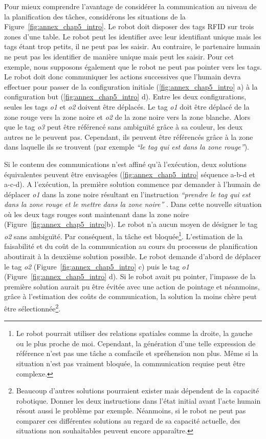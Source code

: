 Pour mieux comprendre l'avantage de considérer la communication au niveau de la planification des tâches, considérons les situations de la Figure~\ref{fig:annex_chap5_intro}. Le robot doit disposer des tags RFID sur trois zones d'une table. Le robot peut les identifier avec leur identifiant unique mais les tags étant trop petits, il ne peut pas les saisir. Au contraire, le partenaire humain ne peut pas les identifier de manière unique mais peut les saisir. Pour cet exemple, nous supposons également que le robot ne peut pas pointer vers les tags. Le robot doit donc communiquer les actions successives que l'humain devra effectuer pour passer de la configuration initiale (\ref{fig:annex_chap5_intro} a) à la configuration but (\ref{fig:annex_chap5_intro} d). Entre les deux configurations, seules les tags \textit{o1} et \textit{o2} doivent être déplacés. Le tag \textit{o1} doit être déplacé de la zone rouge vers la zone noire et \textit{o2} de la zone noire vers la zone blanche. Alors que le tag \textit{o3} peut être référencé sans ambiguïté grâce à sa couleur, les deux autres ne le peuvent pas. Cependant, ils peuvent être référencés grâce à la zone dans laquelle ils se trouvent (par exemple \textit{``le tag qui est dans la zone rouge''}).

Si le contenu des communications n'est affiné qu'à l'exécution, deux solutions équivalentes peuvent être envisagées (\ref{fig:annex_chap5_intro} séquence a-b-d et a-c-d). A l'exécution, la première solution commence par demander à l'humain de déplacer \textit{o1} dans la zone noire résultant en l'instruction \textit{``prendre le tag qui est dans la zone rouge et le mettre dans la zone noire''} . Dans cette nouvelle situation où les deux tags rouges sont maintenant dans la zone noire (Figure~\ref{fig:annex_chap5_intro}b). Le robot n'a aucun moyen de désigner le tag \textit{o2} sans ambiguïté. Par conséquent, la tâche est bloquée\footnote{Le robot pourrait utiliser des relations spatiales comme la droite, la gauche ou le plus proche de moi. Cependant, la génération d'une telle expression de référence n'est pas une tâche a comfacile et spréhension non plus. Même si la situation n'est pas vraiment bloquée, la communication requise peut être complexe. }. L'estimation de la faisabilité et du coût de la communication au cours du processus de planification aboutirait à la deuxième solution possible. Le robot demande d'abord de déplacer le tag \textit{o2} (Figure~\ref{fig:annex_chap5_intro} c) puis le tag \textit{o1} (Figure~\ref{fig:annex_chap5_intro} d). Si le robot avait pu pointer, l'impasse de la première solution aurait pu être évitée avec une action de pointage et néanmoins, grâce à l'estimation des coûts de communication, la solution la moins chère peut être sélectionnée\footnote{Beaucoup d'autres solutions pourraient exister mais dépendent de la capacité robotique. Donner les deux instructions dans l'état initial avant l'acte humain résout aussi le problème par exemple. Néanmoins, si le robot ne peut pas comparer ces différentes solutions au regard de sa capacité actuelle, des situations non souhaitables peuvent encore apparaître.}.

